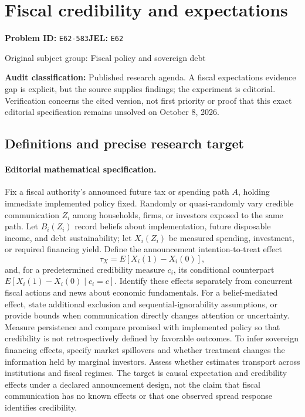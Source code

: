 \documentclass[11pt,a4paper]{article}
\begin{document}
\section*{Fiscal credibility and expectations}
\textbf{Problem ID:} \texttt{E62-583}\quad \textbf{JEL:} \texttt{E62}\par
\label{problem:OP-0260}
{\sffamily\small\color{muted}Original subject group: Fiscal policy and sovereign debt\par}
\label{definitions:problem:30007541}
\textbf{Audit classification:} Published research agenda. A fiscal expectations evidence gap is explicit, but the source supplies findings; the experiment is editorial. Verification concerns the cited version, not first priority or proof that this exact editorial specification remains unsolved on October 8, 2026.
\subsection*{Definitions and precise research target}
\paragraph{Editorial mathematical specification.} Fix a fiscal authority’s announced future tax or spending path \(A\), holding immediate implemented policy fixed. Randomly or quasi-randomly vary credible communication \(Z_i\) among households, firms, or investors exposed to the same path. Let \(B_i(Z_i)\) record beliefs about implementation, future disposable income, and debt sustainability; let \(X_i(Z_i)\) be measured spending, investment, or required financing yield. Define the announcement intention-to-treat effect
\[
\tau_X=E[X_i(1)-X_i(0)],
\]
and, for a predetermined credibility measure \(c_i\), its conditional counterpart \(E[X_i(1)-X_i(0)\mid c_i=c]\).
Identify these effects separately from concurrent fiscal actions and news about economic fundamentals. For a belief-mediated effect, state additional exclusion and sequential-ignorability assumptions, or provide bounds when communication directly changes attention or uncertainty. Measure persistence and compare promised with implemented policy so that credibility is not retrospectively defined by favorable outcomes. To infer sovereign financing effects, specify market spillovers and whether treatment changes the information held by marginal investors. Assess whether estimates transport across institutions and fiscal regimes. The target is causal expectation and credibility effects under a declared announcement design, not the claim that fiscal communication has no known effects or that one observed spread response identifies credibility.
\end{document}
